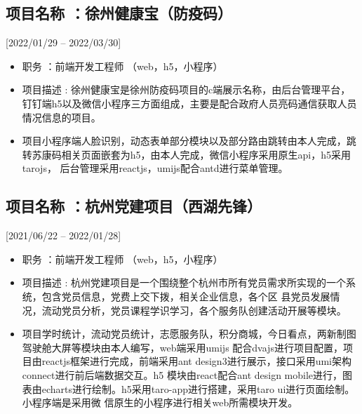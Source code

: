 \documentclass{mycv}
\begin{document}


\subsection{项目名称 ：徐州健康宝（防疫码）}[2022/01/29 – 2022/03/30]

\begin{itemize}
  \item 职务 ：前端开发工程师 （web，h5，小程序）
  \item 项目描述 : 徐州健康宝是徐州防疫码项目的c端展示名称，由后台管理平台，钉钉端h5以及微信小程序三方面组成，主要是配合政府人员亮码通信获取人员情况信息的项目。
  \item  项目小程序端人脸识别，动态表单部分模块以及部分路由跳转由本人完成，跳转苏康码相关页面嵌套为h5，由本人完成，微信小程序采用原生api，h5采用tarojs，
        后台管理采用reactjs，umijs配合antd进行菜单管理。
\end{itemize}

\subsection{项目名称 ：杭州党建项目（西湖先锋）}[2021/06/22 – 2022/01/28]

\begin{itemize}
  \item 职务 ：前端开发工程师 （web，h5，小程序）
  \item 项目描述 : 杭州党建项目是一个围绕整个杭州市所有党员需求所实现的一个系统，包含党员信息，党费上交下拨，相关企业信息，各个区
        县党员发展情况，流动党员分析，党员课程学识学习，各个服务队创建活动开展等模块。
  \item  项目学时统计，流动党员统计，志愿服务队，积分商城，今日看点，两新制图驾驶舱大屏等模块由本人编写，web端采用umijs
        配合dvajs进行项目配置，项目由reactjs框架进行完成，前端采用ant design3进行展示，接口采用umi架构connect进行前后端数据交互。h5
        模块由react配合ant design mobile进行，图表由echarts进行绘制。h5采用taro-app进行搭建，采用taro ui进行页面绘制。小程序端是采用微
        信原生的小程序进行相关web所需模块开发。
\end{itemize}
\end{document}
